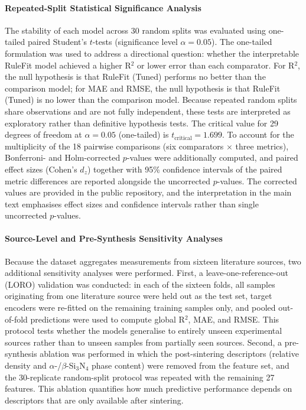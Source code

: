 \documentclass[pdflatex,sn-mathphys-num]{sn-jnl}%
\theoremstyle{thmstyleone}%
\theoremstyle{thmstyletwo}%
\theoremstyle{thmstylethree}%
\begin{document}
\paragraph{Repeated-Split Statistical Significance Analysis}
The stability of each model across 30 random splits was evaluated using one-tailed paired Student's $t$-tests (significance level $\alpha = 0.05$). The one-tailed formulation was used to address a directional question: whether the interpretable RuleFit model achieved a higher R$^2$ or lower error than each comparator. For R$^2$, the null hypothesis is that RuleFit (Tuned) performs no better than the comparison model; for MAE and RMSE, the null hypothesis is that RuleFit (Tuned) is no lower than the comparison model. Because repeated random splits share observations and are not fully independent, these tests are interpreted as exploratory rather than definitive hypothesis tests. The critical value for 29 degrees of freedom at $\alpha = 0.05$ (one-tailed) is $t_\text{critical} = 1.699$. To account for the multiplicity of the 18 pairwise comparisons (six comparators $\times$ three metrics), Bonferroni- and Holm-corrected $p$-values were additionally computed, and paired effect sizes (Cohen's $d_z$) together with 95\% confidence intervals of the paired metric differences are reported alongside the uncorrected $p$-values. The corrected values are provided in the public repository, and the interpretation in the main text emphasises effect sizes and confidence intervals rather than single uncorrected $p$-values.

\paragraph{Source-Level and Pre-Synthesis Sensitivity Analyses}
Because the dataset aggregates measurements from sixteen literature sources, two additional sensitivity analyses were performed. First, a leave-one-reference-out (LORO) validation was conducted: in each of the sixteen folds, all samples originating from one literature source were held out as the test set, target encoders were re-fitted on the remaining training samples only, and pooled out-of-fold predictions were used to compute global R$^2$, MAE, and RMSE. This protocol tests whether the models generalise to entirely unseen experimental sources rather than to unseen samples from partially seen sources. Second, a pre-synthesis ablation was performed in which the post-sintering descriptors (relative density and $\alpha$-/$\beta$-Si$_3$N$_4$ phase content) were removed from the feature set, and the 30-replicate random-split protocol was repeated with the remaining 27 features. This ablation quantifies how much predictive performance depends on descriptors that are only available after sintering.
\end{document}
